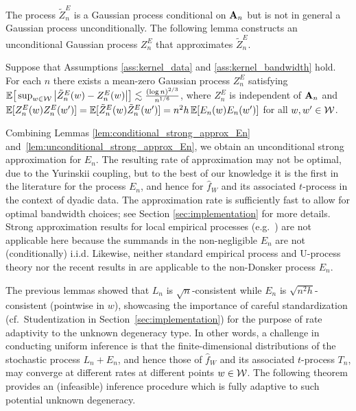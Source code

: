 The process $\tilde Z_n^E$ is a Gaussian process conditional on $\mathbf{A}_n$ but is
not in general a Gaussian process unconditionally. The following lemma
constructs an unconditional Gaussian process $Z_n^E$ that approximates
$\tilde Z_n^E$.

\begin{lemma}
  \label{lem:unconditional_strong_approx_En}

  Suppose that Assumptions \ref{ass:kernel_data} and
  \ref{ass:kernel_bandwidth} hold. For each $n$ there exists
  a mean-zero Gaussian process $Z^E_n$ satisfying
  $\mathbb{E}\big[ \sup_{w \in \mathcal{W}} \big|\tilde Z_n^E(w) - Z_n^E(w)\big| \big]
  \lesssim \frac{(\log n)^{2/3}}{n^{1/6}}$,
  where $Z_n^E$ is independent of $\mathbf{A}_n$ and
  $\mathbb{E}[Z_n^E(w)Z_n^E(w')]=\mathbb{E}[\tilde Z_n^E(w)\tilde Z_n^E(w')]
  = n^2h \, \mathbb{E}[E_n(w)E_n(w')]$ for all $w, w' \in \mathcal{W}$.
\end{lemma}

Combining Lemmas \ref{lem:conditional_strong_approx_En}
and~\ref{lem:unconditional_strong_approx_En}, we obtain an unconditional strong
approximation for $E_n$. The resulting rate of approximation may not be
optimal, due to the Yurinskii coupling, but to the best of our knowledge it is
the first in the literature for the process $E_n$, and hence for $\hat{f}_W$
and its associated $t$-process in the context of dyadic data. The approximation
rate is sufficiently fast to allow for optimal bandwidth choices; see Section
\ref{sec:implementation} for more details. Strong approximation results for
local empirical processes (e.g.\ \citealp{gine2010confidence}) are not
applicable here because the summands in the non-negligible $E_n$ are not
(conditionally) i.i.d. Likewise, neither standard empirical process and
U-process theory \citep{van1996weak,gine2021mathematical} nor the recent
results in \citet{davezies2021exchangeable} are applicable to the non-Donsker
process $E_n$.

The previous lemmas showed that $L_n$ is $\sqrt{n}$-consistent while $E_n$ is
$\sqrt{n^2h}$-consistent (pointwise in $w$), showcasing the importance of
careful standardization (cf.\ Studentization in
Section~\ref{sec:implementation}) for the purpose of rate adaptivity to the
unknown degeneracy type. In other words, a challenge in conducting uniform
inference is that the finite-dimensional distributions of the stochastic
process $L_n+E_n$, and hence those of $\hat{f}_W$ and its associated
$t$-process $T_n$, may converge at different rates at different points
$w\in\mathcal{W}$. The following theorem provides an (infeasible) inference procedure
which is fully adaptive to such potential unknown degeneracy.

